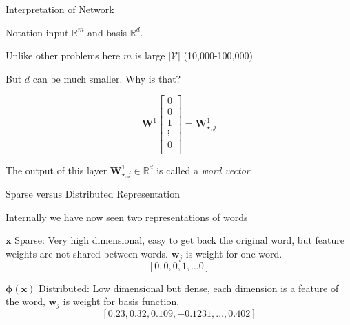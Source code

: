 \documentclass{beamer}
\let\tempone\itemize
\let\temptwo\enditemize
\renewenvironment{itemize}{\tempone\addtolength{\itemsep}{0.5\baselineskip}}{\temptwo}
\newcommand{\air}{\vspace{0.25cm}}
\newcommand{\boldx}{\mathbf{x}}
\newcommand{\boldx}{\mathbf{x}}
\newcommand{\boldw}{\boldsymbol{w}}
\newcommand{\boldW}{\mathbf{W}}
\newcommand{\bphi}{\boldsymbol{\phi}}
\newcommand{\mcV}{\mathcal{V}}
\newcommand{\reals}{\ensuremath{\mathbb{R}}}
\begin{document}
\begin{frame}{Interpretation of Network}

  \begin{itemize}
  \item Notation input $\reals^m$ and basis $\reals^d$.  
  \item Unlike other problems here $m$ is large $|\mcV|$ (10,000-100,000)
  \item But $d$ can be much smaller. Why is that?  
  
  \air
  \[\boldW^1 \begin{bmatrix}0 \\ 0\\ 1 \\ \vdots \\0 \\\end{bmatrix} = \boldW^1_{\star, j} \] 
      
  \item The output of this layer $\boldW^1_{\star, j} \in \reals^d$ is called a \textit{word vector}. 
  \end{itemize}
\end{frame}

\begin{frame}{Sparse versus Distributed Representation}
  \begin{itemize}
  \item Internally we have now seen two representations of words 

  \item $\boldx$ Sparse:  Very high dimensional, easy to get back the original word, 
    but feature weights are not shared between words. $\boldw_j$ is weight for 
    one word. 
    \[ [0, 0, 0, 1, \ldots 0] \] 
    \pause 

  \item $\bphi(\boldx)$ Distributed:  Low dimensional but dense, each dimension is a feature of the 
    word, $\boldw_j$ is weight for basis function. 
    \[ [0.23, 0.32, 0.109, -0.1231, \ldots, 0.402] \] 

  \end{itemize}
\end{frame}
\end{document}
